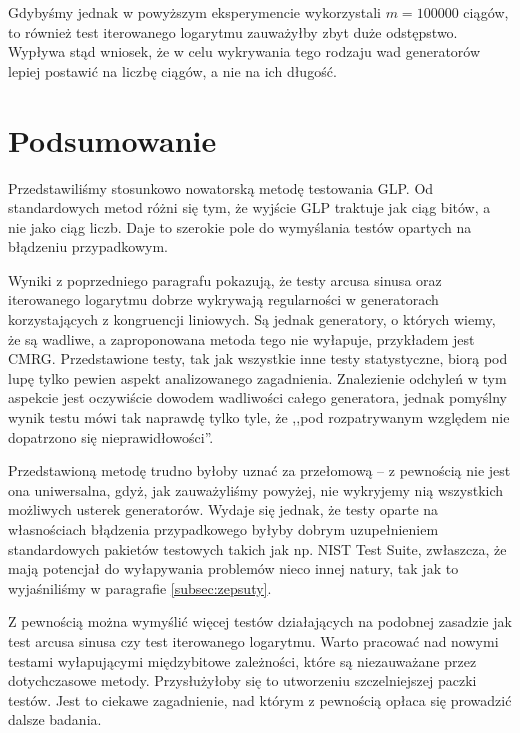 \documentclass[a4paper,11pt,twoside]{book}
\theoremstyle{definition}
\begin{document}
Gdybyśmy jednak w powyższym eksperymencie wykorzystali $m = 100000$ ciągów, to również test iterowanego logarytmu zauważyłby zbyt duże odstępstwo. Wypływa stąd wniosek, że w celu wykrywania tego rodzaju wad generatorów lepiej postawić na liczbę ciągów, a nie na ich długość.

\FloatBarrier
\newpage
\section{Podsumowanie}
Przedstawiliśmy stosunkowo nowatorską metodę testowania GLP. Od standardowych metod różni się tym, że wyjście GLP traktuje jak ciąg bitów, a nie jako ciąg liczb. Daje to szerokie pole do wymyślania testów opartych na błądzeniu przypadkowym.

Wyniki z poprzedniego paragrafu pokazują, że testy arcusa sinusa oraz iterowanego logarytmu dobrze wykrywają regularności w generatorach korzystających z kongruencji liniowych. Są jednak generatory, o których wiemy, że są wadliwe, a zaproponowana metoda tego nie wyłapuje, przykładem jest CMRG. Przedstawione testy, tak jak wszystkie inne testy statystyczne, biorą pod lupę tylko pewien aspekt analizowanego zagadnienia. Znalezienie odchyleń w tym aspekcie jest oczywiście dowodem wadliwości całego generatora, jednak pomyślny wynik testu mówi tak naprawdę tylko tyle, że ,,pod rozpatrywanym względem nie dopatrzono się nieprawidłowości''.

Przedstawioną metodę trudno byłoby uznać za przełomową -- z pewnością nie jest ona uniwersalna, gdyż, jak zauważyliśmy powyżej, nie wykryjemy nią wszystkich możliwych usterek generatorów. Wydaje się jednak, że testy oparte na własnościach błądzenia przypadkowego byłyby dobrym uzupełnieniem standardowych pakietów testowych takich jak np. NIST Test Suite, zwłaszcza, że mają potencjał do wyłapywania problemów nieco innej natury, tak jak to wyjaśniliśmy w paragrafie \ref{subsec:zepsuty}.

Z pewnością można wymyślić więcej testów działających na podobnej zasadzie jak test arcusa sinusa czy test iterowanego logarytmu. Warto pracować nad nowymi testami wyłapującymi międzybitowe zależności, które są niezauważane przez dotychczasowe metody. Przysłużyłoby się to utworzeniu szczelniejszej paczki testów. Jest to ciekawe zagadnienie, nad którym z pewnością opłaca się prowadzić dalsze badania.
\end{document}
